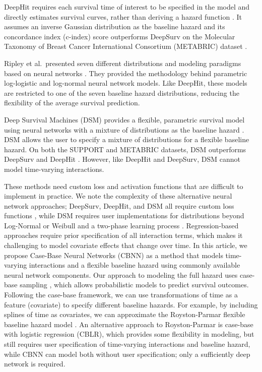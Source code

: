 \documentclass[AMA,STIX1COL,]{WileyNJD-v2}
\begin{document}
DeepHit requires each survival time of interest to be specified in the
model and directly estimates survival curves, rather than deriving a
hazard function \citep{lee2018DeepHit}. It assumes an inverse Gaussian
distribution as the baseline hazard and its concordance index (c-index)
score outperforms DeepSurv \citep{katzman2018DeepSurv} on the Molecular
Taxonomy of Breast Cancer International Consortium (METABRIC) dataset
\citep{curtis2012genomic}.

Ripley et al.~presented seven different distributions and modeling
paradigms based on neural networks \citep{ripley2004non}. They provided
the methodology behind parametric log-logistic and log-normal neural
network models. Like DeepHit, these models are restricted to one of the
seven baseline hazard distributions, reducing the flexibility of the
average survival prediction.

Deep Survival Machines (DSM) provides a flexible, parametric survival
model using neural networks with a mixture of distributions as the
baseline hazard \citep{dsmPaper}. DSM allows the user to specify a
mixture of distributions for a flexible baseline hazard. On both the
SUPPORT and METABRIC datasets, DSM outperforms DeepSurv and DeepHit
\citep{dsmPaper}. However, like DeepHit and DeepSurv, DSM cannot model
time-varying interactions.

These methods need custom loss and activation functions that are
difficult to implement in practice. We note the complexity of these
alternative neural network approaches; DeepSurv, DeepHit, and DSM all
require custom loss functions \citep{katzman2018DeepSurv}
\citep{lee2018DeepHit} \citep{dsmPaper}, while DSM requires user
implementations for distributions beyond Log-Normal or Weibull and a
two-phase learning process \citep{dsmPaper}. Regression-based approaches
require prior specification of all interaction terms, which makes it
challenging to model covariate effects that change over time. In this
article, we propose Case-Base Neural Networks (CBNN) as a method that
models time-varying interactions and a flexible baseline hazard using
commonly available neural network components. Our approach to modeling
the full hazard uses case-base sampling \citep{hanley2009}, which allows
probabilistic models to predict survival outcomes. Following the
case-base framework, we can use transformations of time as a feature
(covariate) to specify different baseline hazards. For example, by
including splines of time as covariates, we can approximate the
Royston-Parmar flexible baseline hazard model
\citep{royston2002flexible}. An alternative approach to Royston-Parmar
is case-base with logistic regression (CBLR), which provides some
flexibility in modeling, but still requires user specification of
time-varying interactions and baseline hazard, while CBNN can model both
without user specification; only a sufficiently deep network is
required.
\end{document}
